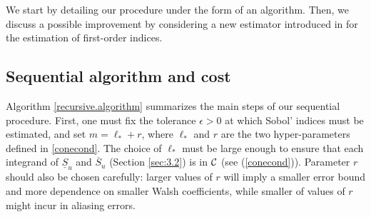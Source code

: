 We start by detailing our procedure under the form of an algorithm. Then, we discuss a possible improvement by considering a new estimator introduced in \cite{Owen} for the estimation of first-order indices.


\subsection{Sequential algorithm and cost}
\label{sec:4.1}

Algorithm \ref{recursive.algorithm} summarizes the main steps of our sequential procedure. First, one must fix the tolerance $\epsilon >0$ at which Sobol' indices must be estimated, and set $m=\ell_*+r$, where $\ell_*$ and $r$ are the two hyper-parameters defined in \eqref{conecond}.  {\color{purple}  The choice of $\ell_*$ must be large enough to ensure that each integrand of $\underline{S}_u$ and $\overline{S}_u$ (Section \ref{sec:3.2}) is in $\mathcal{C}$ (see  (\ref{conecond})). Parameter $r$ should also be chosen carefully: larger values of $r$ will imply a smaller error bound and more dependence on smaller Walsh coefficients, while smaller of values of $r$ might incur in aliasing errors.}

